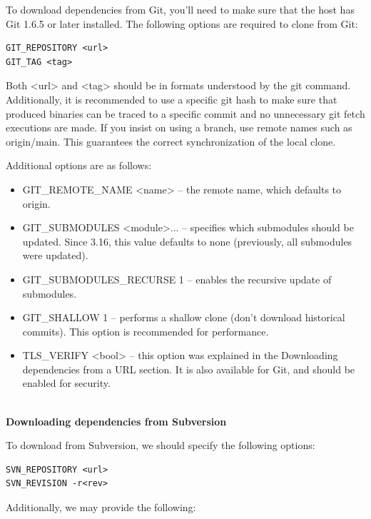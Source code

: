 To download dependencies from Git, you'll need to make sure that the host has Git 1.6.5 or later installed. The following options are required to clone from Git:

\begin{lstlisting}[style=styleCMake]
GIT_REPOSITORY <url>
GIT_TAG <tag>
\end{lstlisting} 

Both <url> and <tag> should be in formats understood by the git command. Additionally, it is recommended to use a specific git hash to make sure that produced binaries can be traced to a specific commit and no unnecessary git fetch executions are made. If you insist on using a branch, use remote names such as origin/main. This guarantees the correct synchronization of the local clone.

Additional options are as follows:

\begin{itemize}
\item 
GIT\_REMOTE\_NAME <name> – the remote name, which defaults to origin.

\item 
GIT\_SUBMODULES <module>... – specifies which submodules should be updated. Since 3.16, this value defaults to none (previously, all submodules were updated).

\item 
GIT\_SUBMODULES\_RECURSE 1 – enables the recursive update of submodules.

\item 
GIT\_SHALLOW 1 – performs a shallow clone (don't download historical commits). This option is recommended for performance.

\item 
TLS\_VERIFY <bool> – this option was explained in the Downloading dependencies from a URL section. It is also available for Git, and should be enabled for security.
\end{itemize}

\hspace*{\fill} \\ %
\noindent
\textbf{Downloading dependencies from Subversion}

To download from Subversion, we should specify the following options:

\begin{lstlisting}[style=styleCMake]
SVN_REPOSITORY <url>
SVN_REVISION -r<rev>
\end{lstlisting} 

Additionally, we may provide the following:


